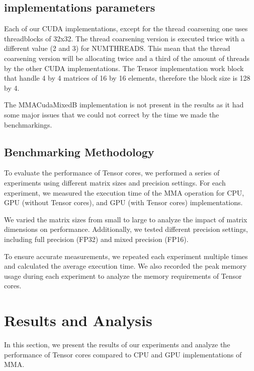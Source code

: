 \documentclass[conference]{IEEEtran}
\begin{document}
  \subsection{implementations parameters}
  Each of our CUDA implementations, except for the thread coarsening one uses threadblocks of 32x32.
  The thread coarsening version is executed twice with a different value (2 and 3) for NUMTHREADS. This
  mean that the thread coarsening version will be allocating twice and a third of the amount of threads
  by the other CUDA implementations. The Tensor implementation work block that handle 4 by 4 matrices of
  16 by 16 elements, therefore the block size is 128 by 4.

  The MMACudaMixedB implementation is not present in the results as it had some major issues that we could
  not correct by the time we made the benchmarkings.

  \subsection{Benchmarking Methodology}\label{sec:benchmarking-methodology}
  
  To evaluate the performance of Tensor cores, we performed a series of experiments using different 
  matrix sizes and precision settings. For each experiment, we measured the execution time of the 
  MMA operation for CPU, GPU (without Tensor cores), and GPU (with Tensor cores) implementations.
  
  We varied the matrix sizes from small to large to analyze the impact of matrix dimensions on 
  performance. Additionally, we tested different precision settings, including full precision (FP32)
  and mixed precision (FP16).
  
  To ensure accurate measurements, we repeated each experiment multiple times and calculated 
  the average execution time. We also recorded the peak memory usage during each experiment to 
  analyze the memory requirements of Tensor cores.
  
  \section{Results and Analysis}\label{sec:results-analysis}
  
  In this section, we present the results of our experiments and analyze the performance of 
  Tensor cores compared to CPU and GPU implementations of MMA.

  
\end{document}
